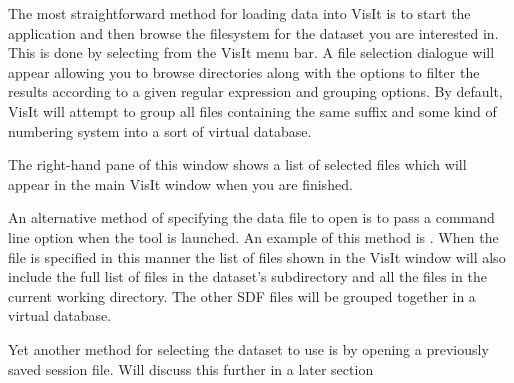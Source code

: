   The most straightforward method for loading data into VisIt is to
  start the application and then browse the filesystem for the dataset
  you are interested in. This is done by selecting  from the VisIt menu bar. A file selection dialogue will appear
  allowing you to browse directories along with the options to filter
  the results according to a given regular expression and grouping options.
  By default, VisIt will attempt to group all files containing the same
  suffix and some kind of numbering system into a sort of virtual database.

  The right-hand pane of this window shows a list of selected files which
  will appear in the main VisIt window when you are finished.

  An alternative method of specifying the data file to open is to pass
  a command line option when the tool is launched. An example of this
  method is . When the file is specified in
  this manner the list of files shown in the VisIt window will also
  include the full list of files in the dataset's subdirectory and
  all the files in the current working directory. The other SDF files
  will be grouped together in a virtual database.

  Yet another method for selecting the dataset to use is by opening a
  previously saved session file. Will discuss this further in a later section

